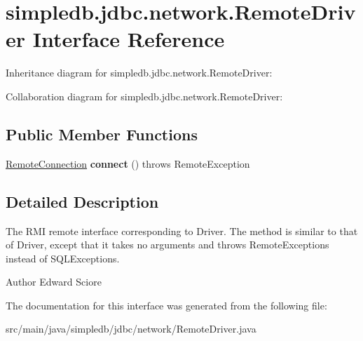 \hypertarget{interfacesimpledb_1_1jdbc_1_1network_1_1RemoteDriver}{}\section{simpledb.\+jdbc.\+network.\+Remote\+Driver Interface Reference}
\label{interfacesimpledb_1_1jdbc_1_1network_1_1RemoteDriver}


Inheritance diagram for simpledb.\+jdbc.\+network.\+Remote\+Driver\+:


Collaboration diagram for simpledb.\+jdbc.\+network.\+Remote\+Driver\+:
\subsection*{Public Member Functions}
\begin{DoxyCompactItemize}
\item 
\mbox{\label{interfacesimpledb_1_1jdbc_1_1network_1_1RemoteDriver_acb8ef6ead6fac0d174714e5e3207788d}} 
\hyperlink{interfacesimpledb_1_1jdbc_1_1network_1_1RemoteConnection}{Remote\+Connection} {\bfseries connect} ()  throws Remote\+Exception
\end{DoxyCompactItemize}


\subsection{Detailed Description}
The R\+MI remote interface corresponding to Driver. The method is similar to that of Driver, except that it takes no arguments and throws Remote\+Exceptions instead of S\+Q\+L\+Exceptions. \begin{DoxyAuthor}{Author}
Edward Sciore 
\end{DoxyAuthor}


The documentation for this interface was generated from the following file\+:\begin{DoxyCompactItemize}
\item 
src/main/java/simpledb/jdbc/network/Remote\+Driver.\+java\end{DoxyCompactItemize}
